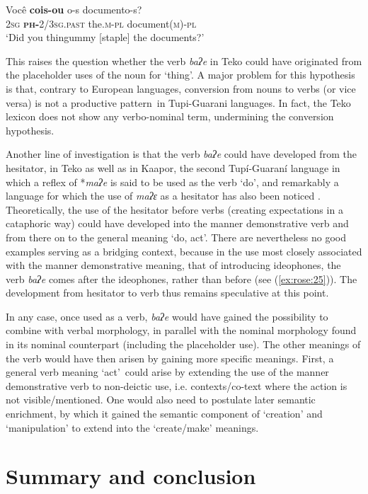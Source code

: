 \documentclass[output=paper]{langscibook}
\begin{document}
\ea \label{ex:rose:47} 
\gll Você  \textbf{cois-ou}  o-s  documento-s?\\
2\textsc{sg}  \textbf{\textsc{ph-}}2/\textsc{3sg.past}  the.\textsc{m-pl}  document(\textsc{m)-pl}\\
\glt ‘Did you thingummy [staple] the documents?’
\z 

This raises the question whether the verb \textit{baʔe} in Teko could have originated from the placeholder uses of the noun for ‘thing’. A major problem for this hypothesis is that, contrary to European languages, conversion from nouns to verbs (or vice versa) is not a productive pattern~in Tupi-Guarani languages. In fact, the Teko lexicon does not show any verbo-nominal term, undermining the conversion hypothesis.  

Another line of investigation is that the verb \textit{baʔe} could have developed from the hesitator, in Teko as well as in Kaapor, the second Tupí-Guaraní language in which a reflex of *\textit{maʔe} is said to be used as the verb ‘do’, and remarkably a language for which the use of \textit{maʔɛ} as a hesitator has also been noticed \citep[209]{Godoy2020}. Theoretically, the use of the hesitator before verbs (creating expectations in a cataphoric way) could have developed into the manner demonstrative verb and from there on to the general meaning ‘do, act’. There are nevertheless no good examples serving as a bridging context, because in the use most closely associated with the manner demonstrative meaning, that of introducing ideophones, the verb \textit{baʔe} comes after the ideophones, rather than before (see (\ref{ex:rose:25})). The development from hesitator to verb thus remains speculative at this point.

In any case, once used as a verb, \textit{baʔe} would have gained the possibility to combine with verbal morphology, in parallel with the nominal morphology found in its nominal counterpart (including the placeholder use). The other meanings of the verb would have then arisen by gaining more specific meanings. First, a general verb meaning ‘act’~could arise by extending the use of the manner demonstrative verb to non-deictic use, i.e. contexts/co-text where the action is not visible/mentioned. One would also need to postulate later semantic enrichment, by which it gained the semantic component of ‘creation’ and ‘manipulation’ to extend into the ‘create/make’ meanings. 

\section{Summary and conclusion}
\label{sec:rose:6}
\end{document}
